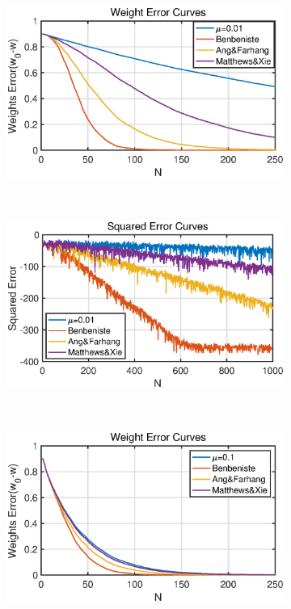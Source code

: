 \begin{figure}[htbp]
     \centering{}
     \begin{subfigure}[b]{0.4\textwidth}
         \centering
         \includegraphics[width=\textwidth]{fig/22/22a1.eps}
     \end{subfigure}
     ~
     \begin{subfigure}[b]{0.4\textwidth}
         \centering
         \includegraphics[width=\textwidth]{fig/22/22a2.eps}
     \end{subfigure}
     ~
     \begin{subfigure}[b]{0.4\textwidth}
         \centering
         \includegraphics[width=\textwidth]{fig/22/22a3.eps}

\end{subfigure}
\end{figure}
